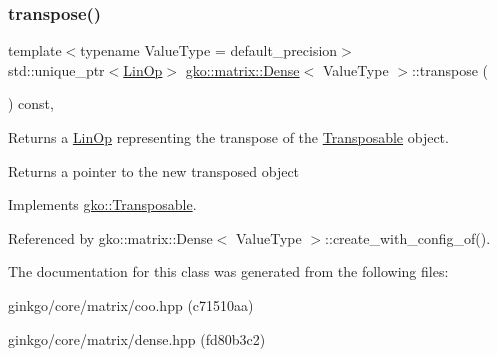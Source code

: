 \subsubsection{\texorpdfstring{transpose()}{transpose()}}
{\footnotesize\ttfamily template$<$typename Value\+Type = default\+\_\+precision$>$ \\
std\+::unique\+\_\+ptr$<$\hyperlink{classgko_1_1LinOp}{Lin\+Op}$>$ \hyperlink{classgko_1_1matrix_1_1Dense}{gko\+::matrix\+::\+Dense}$<$ Value\+Type $>$\+::transpose (\begin{DoxyParamCaption}{ }\end{DoxyParamCaption}) const\hspace{0.3cm}{\ttfamily [override]}, {\ttfamily [virtual]}}



Returns a \hyperlink{classgko_1_1LinOp}{Lin\+Op} representing the transpose of the \hyperlink{classgko_1_1Transposable}{Transposable} object. 

\begin{DoxyReturn}{Returns}
a pointer to the new transposed object 
\end{DoxyReturn}


Implements \hyperlink{classgko_1_1Transposable_a5c6b778b71b47d53e0bda6ccf894d318}{gko\+::\+Transposable}.



Referenced by gko\+::matrix\+::\+Dense$<$ Value\+Type $>$\+::create\+\_\+with\+\_\+config\+\_\+of().



The documentation for this class was generated from the following files\+:\begin{DoxyCompactItemize}
\item 
ginkgo/core/matrix/coo.\+hpp (c71510aa)\item 
ginkgo/core/matrix/dense.\+hpp (fd80b3c2)\end{DoxyCompactItemize}
